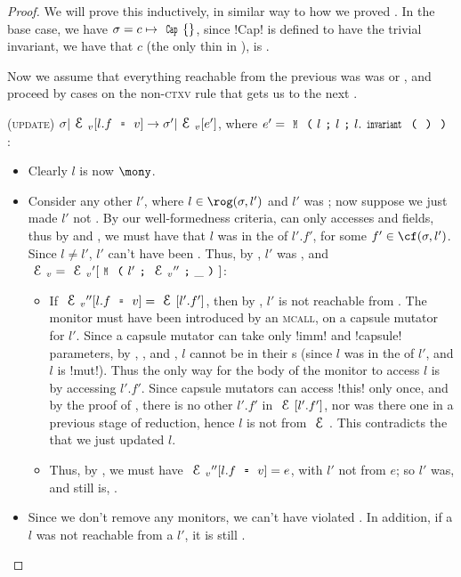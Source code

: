 \begin{proof}
We will prove this inductively, in similar way to how we proved .
In the base case, we have $\s = c\mapsto\Kw{Cap}\{\}$, since \Q!Cap! is defined to have the trivial invariant, we have that $c$ (the only thin in \s), is \valid.

Now we assume that everything reachable from the previous \VS was was \valid or \mony, and proceed by cases on the non-\textsc{ctxv} rule that gets us to the next \VS.
\begin{ienumerate}

	\item (\textsc{update}) $\s|\EV[l.f\equals v]\rightarrow \s'|\EV[e']$, where  $e'=\M{l}{l}{l.\invariant}$:
	\begin{itemize}
		\item Clearly $l$ is now $\mony$.
		\item Consider any other $l'$, where $l \in \rog(\s,l')$ and $l'$ was \valid; now suppose we just made $l'$ not \valid. By our well-formedness criteria, \Q@invariant@ can only accesses \Q@imm@ and \Q@capsule@ fields, thus by  and , we must have that $l$ was in the \rog of $l'.f'$, for some $f' \in \cf(\s, l')$. Since $l \neq l'$, $l'$ can't have been \WE. Thus, by , $l'$ was \HNO, and $\EV = \EV'[\M{l'}{\EV''}{\_}]$:
		\begin{itemize}
			\item If $\EV''[l.f \equals v] = \E[l'.f']$, then by \HNO, $l'$ is not reachable from \E. The monitor must have been introduced by an \textsc{mcall}, on a capsule mutator for $l'$. Since a capsule mutator can take only \Q!imm! and \Q!capsule! parameters, by , , and , $l$ cannot be in their \rog{}s (since $l$ was in the \rog of $l'$, and $l$ is \Q!mut!). Thus the only way for the body of the monitor to access $l$ is by accessing $l'.f'$.
			Since capsule mutators can access \Q!this! only once, and by the proof of , there is no other $l'.f'$ in $\E[l'.f']$, nor was there one in a previous stage of reduction, hence $l$ is not \reach from $\E$. This contradicts the that we just updated $l$.
			\item Thus, by \HNO, we must have $\EV''[l.f \equals v] = e$, with $l'$ not \reach from $e$; so $l'$ was, and still is, \mony.
		\end{itemize}
		\item Since we don't remove any monitors, we can't have violated \mony. In addition, if a $l$ was not reachable from a \valid $l'$, it is still \valid.
	\end{itemize}


\end{ienumerate}
\end{proof}
